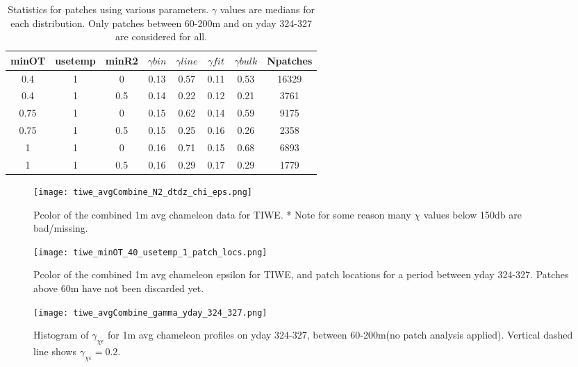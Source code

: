 \documentclass[11pt]{article}
\begin{document}
\begin{table}[htdp]
\caption{Statistics for patches using various parameters. $\gamma$ values are medians for each distribution. Only patches between 60-200m and on yday 324-327 are considered for all.}
\begin{center}
\begin{tabular}{|c|c|c|c|c|c|c|c|}
\hline
minOT & usetemp & minR2 & $\gamma bin$ & $\gamma line$ & $\gamma fit$ & $\gamma bulk$ & Npatches \\
\hline
0.4 & 1 & 0 & 0.13 & 0.57 & 0.11 & 0.53 & 16329 \\
\hline
0.4 & 1 & 0.5 & 0.14 & 0.22 & 0.12 & 0.21 & 3761 \\
\hline
0.75 & 1 & 0 & 0.15 & 0.62 & 0.14 & 0.59 & 9175 \\
\hline
0.75 & 1 & 0.5 & 0.15 & 0.25 & 0.16 & 0.26 & 2358 \\
\hline
1 & 1 & 0 & 0.16 & 0.71 & 0.15 & 0.68 & 6893 \\
\hline
1 & 1 & 0.5 & 0.16 & 0.29 & 0.17 & 0.29 & 1779 \\
\hline
\hline
\hline
\end{tabular}
\end{center}
\label{tab}
\end{table}%


\begin{figure}[htbp]
\texttt{[image: tiwe\_avgCombine\_N2\_dtdz\_chi\_eps.png]}
\caption{Pcolor of the combined 1m avg chameleon data for TIWE. * Note for some reason many $\chi$ values below 150db are bad/missing.}
\label{1mavgsum}
\end{figure}



\begin{figure}[htbp]
\texttt{[image: tiwe\_minOT\_40\_usetemp\_1\_patch\_locs.png]}
\caption{Pcolor of the combined 1m avg chameleon epsilon for TIWE, and patch locations for a period between yday 324-327. Patches above 60m have not been discarded yet.}
\label{patchlocs}
\end{figure}



\begin{figure}[htbp]
\texttt{[image: tiwe\_avgCombine\_gamma\_yday\_324\_327.png]}
\caption{Histogram of $\gamma_{\chi\epsilon}$ for 1m avg chameleon profiles on yday 324-327, between 60-200m(no patch analysis applied). Vertical dashed line shows $\gamma_{\chi\epsilon}=0.2$.}
\label{avggam}
\end{figure}
\end{document}
